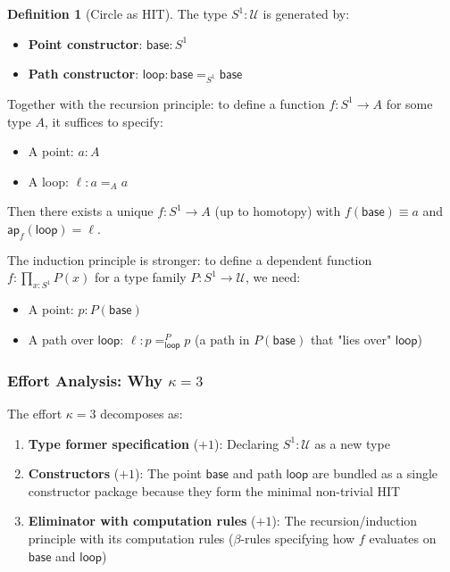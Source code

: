 \documentclass[11pt]{article}
\theoremstyle{definition}
\newtheorem{definition}[theorem]{Definition}
\begin{document}
\begin{definition}[Circle as HIT]
\label{def:circle}
The type $S^1 : \mathcal{U}$ is generated by:
\begin{itemize}
\item \textbf{Point constructor}: $\mathsf{base} : S^1$
\item \textbf{Path constructor}: $\mathsf{loop} : \mathsf{base} =_{S^1} \mathsf{base}$
\end{itemize}
Together with the recursion principle: to define a function $f : S^1 \to A$ for some type $A$, it suffices to specify:
\begin{itemize}
\item A point: $a : A$
\item A loop: $\ell : a =_A a$
\end{itemize}
Then there exists a unique $f : S^1 \to A$ (up to homotopy) with $f(\mathsf{base}) \equiv a$ and $\mathsf{ap}_f(\mathsf{loop}) = \ell$.
\end{definition}

The induction principle is stronger: to define a dependent function $f : \prod_{x:S^1} P(x)$ for a type family $P : S^1 \to \mathcal{U}$, we need:
\begin{itemize}
\item A point: $p : P(\mathsf{base})$
\item A path over $\mathsf{loop}$: $\ell : p =^P_{\mathsf{loop}} p$ (a path in $P(\mathsf{base})$ that "lies over" $\mathsf{loop}$)
\end{itemize}

\subsubsection{Effort Analysis: Why $\kappa = 3$}

The effort $\kappa = 3$ decomposes as:

\begin{enumerate}
\item \textbf{Type former specification} ($+1$): Declaring $S^1 : \mathcal{U}$ as a new type
\item \textbf{Constructors} ($+1$): The point $\mathsf{base}$ and path $\mathsf{loop}$ are bundled as a single constructor package because they form the minimal non-trivial HIT
\item \textbf{Eliminator with computation rules} ($+1$): The recursion/induction principle with its computation rules ($\beta$-rules specifying how $f$ evaluates on $\mathsf{base}$ and $\mathsf{loop}$)
\end{enumerate}
\end{document}
